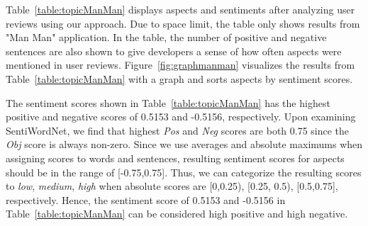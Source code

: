 Table~\ref{table:topicManMan} displays aspects and sentiments after analyzing user reviews using our approach. Due to space limit, the table only shows results from "Man Man" application. In the table, the number of positive and negative sentences are also shown to give developers a sense of how often aspects were mentioned in user reviews. Figure~\ref{fig:graphmanman} visualizes the results from Table~\ref{table:topicManMan} with a graph and sorts aspects by sentiment scores. 

The sentiment scores shown in Table~\ref{table:topicManMan} has the highest positive and negative scores of 0.5153 and -0.5156, respectively. Upon examining SentiWordNet, we find that highest \textit{Pos} and \textit{Neg} scores are both 0.75 since the \textit{Obj} score is always non-zero. Since we use averages and absolute maximums when assigning scores to words and sentences, resulting sentiment scores for aspects should be in the range of [-0.75,0.75]. Thus, we can categorize the resulting scores to \textit{low}, \textit{medium}, \textit{high} when absolute scores are [0,0.25), [0.25, 0.5), [0.5,0.75], respectively. Hence, the sentiment score of 0.5153 and -0.5156 in Table~\ref{table:topicManMan} can be considered high positive and high negative. 

